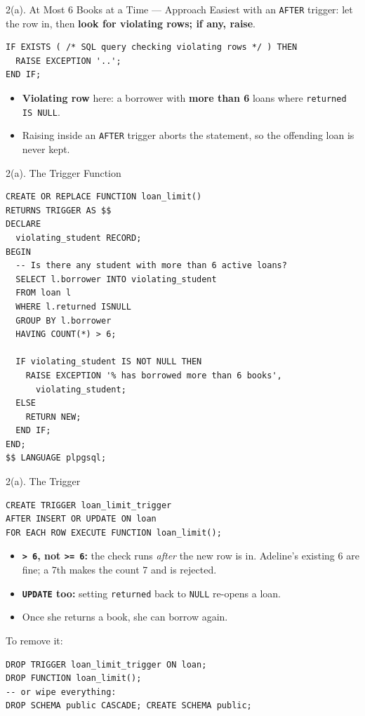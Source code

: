 \documentclass{beamer}
\begin{document}
\begin{frame}[fragile]{2(a). At Most 6 Books at a Time --- Approach}
\small
Easiest with an \texttt{AFTER} trigger: let the row in, then \textbf{look for violating rows; if any, raise}.
\begin{lstlisting}[language=plpgsql,basicstyle=\ttfamily\footnotesize]
IF EXISTS ( /* SQL query checking violating rows */ ) THEN
  RAISE EXCEPTION '..';
END IF;
\end{lstlisting}
\begin{itemize}
  \item \textbf{Violating row} here: a borrower with \textbf{more than 6} loans where \texttt{returned IS NULL}.
  \item Raising inside an \texttt{AFTER} trigger aborts the statement, so the offending loan is never kept.
\end{itemize}
\end{frame}

\begin{frame}[fragile]{2(a). The Trigger Function}
\footnotesize
\begin{lstlisting}[language=plpgsql]
CREATE OR REPLACE FUNCTION loan_limit()
RETURNS TRIGGER AS $$
DECLARE
  violating_student RECORD;
BEGIN
  -- Is there any student with more than 6 active loans?
  SELECT l.borrower INTO violating_student
  FROM loan l
  WHERE l.returned ISNULL
  GROUP BY l.borrower
  HAVING COUNT(*) > 6;

  IF violating_student IS NOT NULL THEN
    RAISE EXCEPTION '% has borrowed more than 6 books',
      violating_student;
  ELSE
    RETURN NEW;
  END IF;
END;
$$ LANGUAGE plpgsql;
\end{lstlisting}
\end{frame}

\begin{frame}[fragile]{2(a). The Trigger}
\small
\begin{lstlisting}[language=plpgsql]
CREATE TRIGGER loan_limit_trigger
AFTER INSERT OR UPDATE ON loan
FOR EACH ROW EXECUTE FUNCTION loan_limit();
\end{lstlisting}
\begin{itemize}
  \item \textbf{\texttt{> 6}, not \texttt{>= 6}:} the check runs \emph{after} the new row is in. Adeline's existing 6 are fine; a 7th makes the count 7 and is rejected.
  \item \textbf{\texttt{UPDATE} too:} setting \texttt{returned} back to \texttt{NULL} re-opens a loan.
  \item Once she returns a book, she can borrow again.
\end{itemize}
\medskip
To remove it:
\begin{lstlisting}[language=plpgsql]
DROP TRIGGER loan_limit_trigger ON loan;
DROP FUNCTION loan_limit();
-- or wipe everything:
DROP SCHEMA public CASCADE; CREATE SCHEMA public;
\end{lstlisting}
\end{frame}
\end{document}
